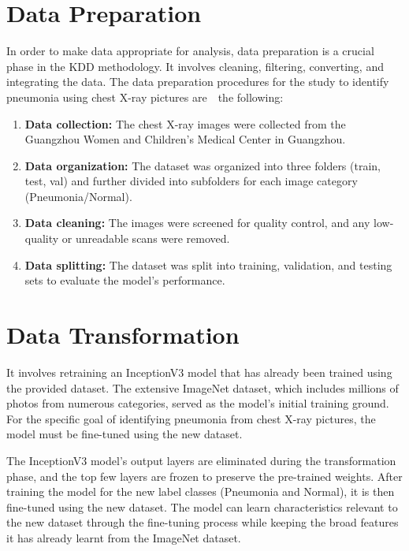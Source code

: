 

 \bigskip
 
 \section{Data Preparation}
 
 In order to make data appropriate for analysis, data preparation is a crucial phase in the KDD methodology. It involves cleaning, filtering, converting, and integrating the data\cite{Witten:2002}. The data preparation procedures for the study to identify pneumonia using chest X-ray pictures are  the following:

 \bigskip
 \begin{enumerate}
 	
 	\item \textbf{Data collection:} The chest X-ray images were collected from the Guangzhou Women and Children’s Medical Center in Guangzhou.
 	\item \textbf{Data organization:} The dataset was organized into three folders (train, test, val) and further divided into subfolders for each image category (Pneumonia/Normal).
 	\item \textbf{Data cleaning:} The images were screened for quality control, and any low-quality or unreadable scans were removed.
 	\item \textbf{Data splitting:} The dataset was split into training, validation, and testing sets to evaluate the model's performance.

 \end{enumerate}

 
  \section{Data Transformation}
 
It involves retraining an InceptionV3 model that has already been trained using the provided dataset. The extensive ImageNet dataset, which includes millions of photos from numerous categories, served as the model's initial training ground. For the specific goal of identifying pneumonia from chest X-ray pictures, the model must be fine-tuned using the new dataset.\cite{Geron:2022}
  \bigskip
 
 The InceptionV3 model's output layers are eliminated during the transformation phase, and the top few layers are frozen to preserve the pre-trained weights. After training the model for the new label classes (Pneumonia and Normal), it is then fine-tuned using the new dataset. The model can learn characteristics relevant to the new dataset through the fine-tuning process while keeping the broad features it has already learnt from the ImageNet dataset.
 \bigskip
 
